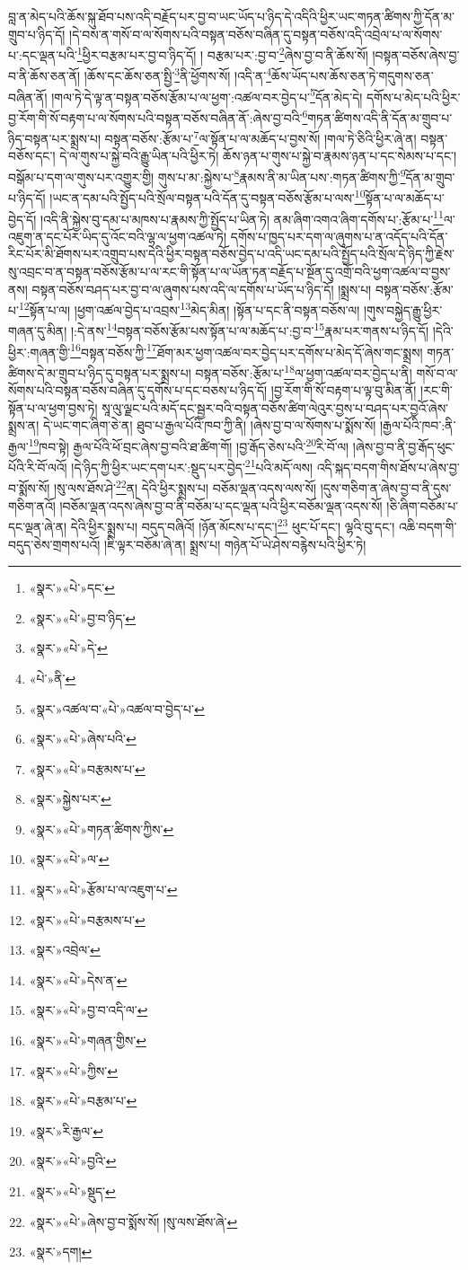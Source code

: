བླ་ན་མེད་པའི་ཆོས་སྐུ་ཐོབ་པས་འདི་བརྗོད་པར་བྱ་བ་ཡང་ཡོད་པ་ཉིད་དེ་འདིའི་ཕྱིར་ཡང་གཏན་ཚིགས་ཀྱི་དོན་མ་གྲུབ་པ་ཉིད་དོ། །དེ་བས་ན་གསོ་བ་ལ་སོགས་པའི་བསྟན་བཅོས་བཞིན་དུ་བསྟན་བཅོས་འདི་འབྲེལ་པ་ལ་སོགས་པ་:དང་ལྡན་པའི་\footnote{«སྣར་»«པེ་»དང་}ཕྱིར་བརྩམ་པར་བྱ་བ་ཉིད་དོ། །
བརྩམ་པར་:བྱ་བ་\footnote{«སྣར་»«པེ་»བྱ་བ་ཉིད་}ཞེས་བྱ་བ་ནི་ཆོས་སོ། །བསྟན་བཅོས་ཞེས་བྱ་བ་ནི་ཆོས་ཅན་ནོ། །ཆོས་དང་ཆོས་ཅན་སྤྱི་\footnote{«སྣར་»«པེ་»དེ་}ནི་ཕྱོགས་སོ། །འདི་ན་\footnote{«པེ་»ནི་}ཆོས་ཡོད་པས་ཆོས་ཅན་ཏེ་གདུགས་ཅན་བཞིན་ནོ། །གལ་ཏེ་དེ་ལྟ་ན་བསྟན་བཅོས་རྩོམ་པ་ལ་ཕྱག་:འཚལ་བར་བྱེད་པ་\footnote{«སྣར་»འཚལ་བ་«པེ་»འཚལ་བ་བྱེད་པ་}དོན་མེད་དེ། དགོས་པ་མེད་པའི་ཕྱིར་བྱ་རོག་གི་སོ་བརྟག་པ་ལ་སོགས་པའི་བསྟན་བཅོས་བཞིན་ནོ་:ཞེས་བྱ་བའི་\footnote{«སྣར་»«པེ་»ཞེས་པའི་}གཏན་ཚིགས་འདི་ནི་དོན་མ་གྲུབ་པ་ཉིད་བསྟན་པར་སྨྲས་པ། བསྟན་བཅོས་:རྩོམ་པ་\footnote{«སྣར་»«པེ་»བརྩམས་པ་}ལ་སྟོན་པ་ལ་མཆོད་པ་བྱས་སོ། །གལ་ཏེ་ཅིའི་ཕྱིར་ཞེ་ན། བསྟན་བཅོས་དང་། དེ་ལ་གུས་པ་སྐྱེ་བའི་རྒྱུ་ཡིན་པའི་ཕྱིར་ཏེ། ཆོས་ཉན་པ་གུས་པ་སྐྱེ་བ་རྣམས་ཉན་པ་དང་སེམས་པ་དང་། བསྒོམ་པ་དག་ལ་གུས་པར་འགྱུར་གྱི། གུས་པ་མ་:སྐྱེས་པ་\footnote{«སྣར་»སྐྱེས་པར་}རྣམས་ནི་མ་ཡིན་པས་:གཏན་ཚིགས་ཀྱི་\footnote{«སྣར་»«པེ་»གཏན་ཚིགས་ཀྱིས་}དོན་མ་གྲུབ་པ་ཉིད་དོ། །ཡང་ན་དམ་པའི་སྤྱོད་པའི་སྲོལ་བསྟན་པའི་དོན་དུ་བསྟན་བཅོས་རྩོམ་པ་ལས་\footnote{«སྣར་»«པེ་»ལ་}སྟོན་པ་ལ་མཆོད་པ་བྱེད་དོ། །འདི་ནི་སྐྱེས་བུ་དམ་པ་མཁས་པ་རྣམས་ཀྱི་སྤྱོད་པ་ཡིན་ཏེ། ནམ་ཞིག་འགའ་ཞིག་དགོས་པ་:རྩོམ་པ་\footnote{«སྣར་»«པེ་»རྩོམ་པ་ལ་འཇུག་པ་}ལ་འཇུག་ན་དང་པོར་ཡིད་དུ་འོང་བའི་ལྷ་ལ་ཕྱག་འཚལ་ཏེ། དགོས་པ་ཁྱད་པར་དག་ལ་ཞུགས་པ་ན་འདོད་པའི་དོན་རིང་པོར་མི་ཐོགས་པར་འགྲུབ་པས་དེའི་ཕྱིར་བསྟན་བཅོས་བྱེད་པ་འདི་ཡང་དམ་པའི་སྤྱོད་པའི་སྲོལ་དེ་ཉིད་ཀྱི་རྗེས་སུ་འབྲང་བ་ན་བསྟན་བཅོས་རྩོམ་པ་ལ་རང་གི་སྟོན་པ་ལ་ཡོན་ཏན་བརྗོད་པ་སྔོན་དུ་འགྲོ་བའི་ཕྱག་འཚལ་བ་བྱས་ནས། བསྟན་བཅོས་བཤད་པར་བྱ་བ་ལ་ཞུགས་པས་འདི་ལ་དགོས་པ་ཡོད་པ་ཉིད་དོ། །སྨྲས་པ། བསྟན་བཅོས་:རྩོམ་པ་\footnote{«སྣར་»«པེ་»བརྩམས་པ་}སྟོན་པ་ལ། །ཕྱག་འཚལ་བྱེད་པ་འབྲས་\footnote{«སྣར་»འབྲེལ་}མེད་མིན། །སྟོན་པ་དང་ནི་བསྟན་བཅོས་ལ། །གུས་བསྐྱེད་རྒྱུ་ཕྱིར་གཞན་དུ་མིན། །:དེ་ནས་\footnote{«སྣར་»«པེ་»དེས་ན་}བསྟན་བཅོས་རྩོམ་པས་སྟོན་པ་ལ་མཆོད་པ་:བྱ་བ་\footnote{«སྣར་»«པེ་»བྱ་བ་འདི་ལ་}རྣམ་པར་གནས་པ་ཉིད་དོ། །དེའི་ཕྱིར་:གཞན་གྱི་\footnote{«སྣར་»«པེ་»གཞན་གྱིས་}བསྟན་བཅོས་ཀྱི་\footnote{«སྣར་»«པེ་»ཀྱིས་}ཐོག་མར་ཕྱག་འཚལ་བར་བྱེད་པར་དགོས་པ་མེད་དོ་ཞེས་གང་སྨྲས། གཏན་ཚིགས་དེ་མ་གྲུབ་པ་ཉིད་དུ་བསྟན་པར་སྨྲས་པ། བསྟན་བཅོས་:རྩོམ་པ་\footnote{«སྣར་»«པེ་»བརྩམ་པ་}ལ་ཕྱག་འཚལ་བར་བྱེད་པ་ནི། གསོ་བ་ལ་སོགས་པའི་བསྟན་བཅོས་བཞིན་དུ་དགོས་པ་དང་བཅས་པ་ཉིད་དོ། །བྱ་རོག་གི་སོ་བརྟག་པ་ལྟ་བུ་མིན་ནོ། །རང་གི་སྟོན་པ་ལ་ཕྱག་བྱས་ཏེ། སཱ་ལུ་ལྗང་པའི་མདོ་དང་སྦྱར་བའི་བསྟན་བཅོས་ཚིག་ལེའུར་བྱས་པ་བཤད་པར་བྱའོ་ཞེས་སྨྲས་ན། དེ་ཡང་གང་ཞིག་ཅེ་ན། ཐུབ་པ་རྒྱལ་པོའི་ཁབ་ཀྱི་ནི། །ཞེས་བྱ་བ་ལ་སོགས་པ་སྨོས་སོ། །རྒྱལ་པོའི་ཁབ་:ནི་རྒྱལ་\footnote{«སྣར་»རི་རྒྱལ་}ཁབ་སྟེ། རྒྱལ་པོའི་ཕོ་བྲང་ཞེས་བྱ་བའི་ཐ་ཚིག་གོ། །བྱ་རྒོད་ཅེས་པའི་\footnote{«སྣར་»«པེ་»བྱའི་}རི་བོ་ལ། །ཞེས་བྱ་བ་ནི་བྱ་རྒོད་ཕུང་པོའི་རི་བོ་ལའོ། །དེ་ཉིད་ཀྱི་ཕྱིར་ཡང་དག་པར་:སྡུད་པར་བྱེད་\footnote{«སྣར་»«པེ་»སྡུད་}པའི་མདོ་ལས། འདི་སྐད་བདག་གིས་ཐོས་པ་ཞེས་བྱ་བ་སྨོས་སོ། །སུ་ལས་ཐོས་ཤེ་\footnote{«སྣར་»«པེ་»ཞེས་བྱ་བ་སྨོས་སོ། །སུ་ལས་ཐོས་ཞེ་}ན། དེའི་ཕྱིར་སྨྲས་པ། བཅོམ་ལྡན་འདས་ལས་སོ། །དུས་གཅིག་ན་ཞེས་བྱ་བ་ནི་དུས་གཅིག་ནའོ། །བཅོམ་ལྡན་འདས་ཞེས་བྱ་བ་ནི་བཅོམ་པ་དང་ལྡན་པའི་ཕྱིར་བཅོམ་ལྡན་འདས་སོ། །ཅི་ཞིག་བཅོམ་པ་དང་ལྡན་ཞེ་ན། དེའི་ཕྱིར་སྨྲས་པ། བདུད་བཞིའོ། །ཉོན་མོངས་པ་དང་།\footnote{«སྣར་»དག།} ཕུང་པོ་དང་། ལྷའི་བུ་དང་། འཆི་བདག་གི་བདུད་ཅེས་གྲགས་པའོ། །ཇི་ལྟར་བཅོམ་ཞེ་ན། སྨྲས་པ། གཉེན་པོ་ཡེ་ཤེས་བརྙེས་པའི་ཕྱིར་ཏེ། 